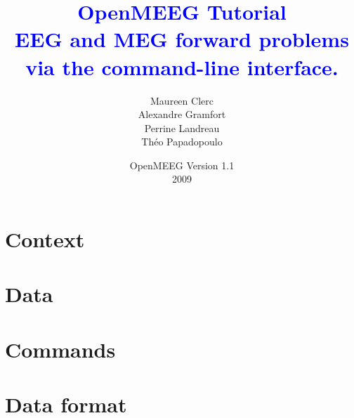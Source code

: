 \documentclass[10pt,a4paper,makeidx]{book}
\title{{\textbf{\textcolor{blue}{OpenMEEG Tutorial\\
        {\Large EEG and MEG forward problems\\
                via the command-line interface.}}}}}
\author{Maureen Clerc\\Alexandre Gramfort \\
        Perrine Landreau\\Théo Papadopoulo}
\date{OpenMEEG Version 1.1\\2009}
\begin{document}
    \maketitle
    \tableofcontents

    \chapter{Context}
    

    \chapter{Data}
    

    \chapter{Commands}
    

    \appendix
    \chapter{Data format}
	\label{chap:format}
    
\end{document}
